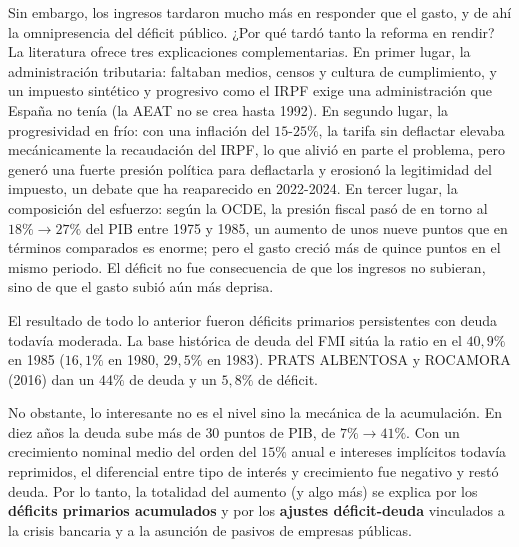 \documentclass[10pt,a4paper]{article}
\begin{document}
Sin embargo, los ingresos tardaron mucho más en responder que el gasto, y de ahí la omnipresencia del déficit público. ¿Por qué tardó tanto la reforma en rendir? La literatura ofrece tres explicaciones complementarias. En primer lugar, la administración tributaria: faltaban medios, censos y cultura de cumplimiento, y un impuesto sintético y progresivo como el IRPF exige una administración que España no tenía (la AEAT no se crea hasta 1992). En segundo lugar, la progresividad en frío: con una inflación del $15$-$25\%$, la tarifa sin deflactar elevaba mecánicamente la recaudación del IRPF, lo que alivió en parte el problema, pero generó una fuerte presión política para deflactarla y erosionó la legitimidad del impuesto, un debate que ha reaparecido en 2022-2024. En tercer lugar, la composición del esfuerzo: según la OCDE, la presión fiscal pasó de en torno al $18\%\to27\%$ del PIB entre 1975 y 1985, un aumento de unos nueve puntos que en términos comparados es enorme; pero el gasto creció más de quince puntos en el mismo periodo. El déficit no fue consecuencia de que los ingresos no subieran, sino de que el gasto subió aún más deprisa.


El resultado de todo lo anterior fueron déficits primarios persistentes con deuda todavía moderada. La base histórica de deuda del FMI sitúa la ratio en el $40,9\%$ en 1985 ($16,1\%$ en 1980, $29,5\%$ en 1983). PRATS ALBENTOSA y ROCAMORA (2016) dan un $44\%$ de deuda y un $5,8\%$ de déficit. 

No obstante, lo interesante no es el nivel sino la mecánica de la acumulación. En diez años la deuda sube más de $30$ puntos de PIB, de $7\%\to 41\%$. Con un crecimiento nominal medio del orden del $15\%$ anual e intereses implícitos todavía reprimidos, el diferencial entre tipo de interés y crecimiento fue negativo y restó deuda. Por lo tanto, la totalidad del aumento (y algo más) se explica por los \textbf{déficits primarios acumulados} y por los \textbf{ajustes déficit-deuda} vinculados a la crisis bancaria y a la asunción de pasivos de empresas públicas. 
\end{document}
